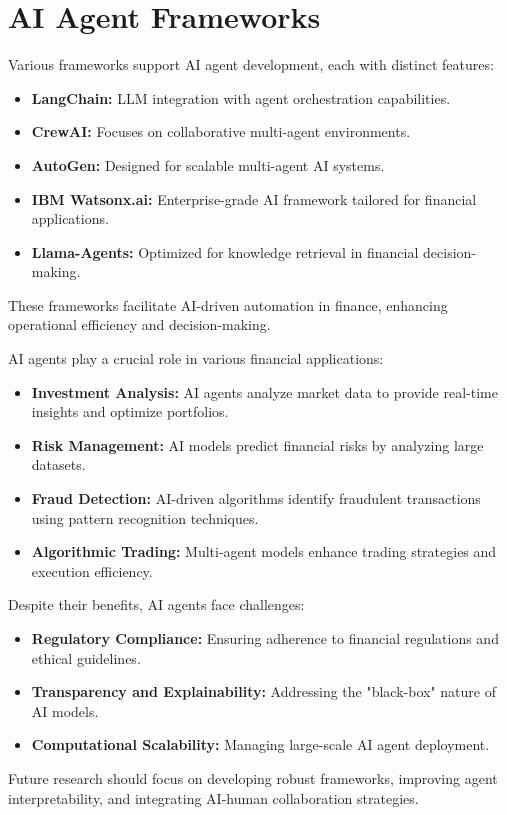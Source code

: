 \documentclass[a4paper,headinclude=on,footinclude=on,12pt,oneside]{scrbook}
\begin{document}
\section{AI Agent Frameworks}
Various frameworks support AI agent development, each with distinct features:
\begin{itemize}
	\item \textbf{LangChain:} LLM integration with agent orchestration capabilities.
	\item \textbf{CrewAI:} Focuses on collaborative multi-agent environments.
	\item \textbf{AutoGen:} Designed for scalable multi-agent AI systems.
	\item \textbf{IBM Watsonx.ai:} Enterprise-grade AI framework tailored for financial applications.
	\item \textbf{Llama-Agents:} Optimized for knowledge retrieval in financial decision-making.
\end{itemize}
These frameworks facilitate AI-driven automation in finance, enhancing operational efficiency and decision-making.

AI agents play a crucial role in various financial applications:
\begin{itemize}
	\item \textbf{Investment Analysis:} AI agents analyze market data to provide real-time insights and optimize portfolios.
	\item \textbf{Risk Management:} AI models predict financial risks by analyzing large datasets.
	\item \textbf{Fraud Detection:} AI-driven algorithms identify fraudulent transactions using pattern recognition techniques.
	\item \textbf{Algorithmic Trading:} Multi-agent models enhance trading strategies and execution efficiency.
\end{itemize}

Despite their benefits, AI agents face challenges:
\begin{itemize}
	\item \textbf{Regulatory Compliance:} Ensuring adherence to financial regulations and ethical guidelines.
	\item \textbf{Transparency and Explainability:} Addressing the "black-box" nature of AI models.
	\item \textbf{Computational Scalability:} Managing large-scale AI agent deployment.
\end{itemize}
Future research should focus on developing robust frameworks, improving agent interpretability, and integrating AI-human collaboration strategies.
\end{document}
